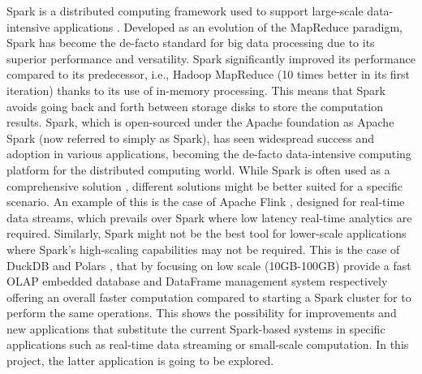 Spark is a distributed computing framework used to support large-scale data-intensive applications \cite{zaharia2010spark}. Developed as an evolution of the MapReduce paradigm, Spark has become the de-facto standard for big data processing due to its superior performance and versatility. Spark significantly improved its performance compared to its predecessor, i.e., Hadoop MapReduce (10 times better in its first iteration) \cite{zaharia2010spark} thanks to its use of in-memory processing. This means that Spark avoids going back and forth between storage disks to store the computation results. Spark, which is open-sourced under the Apache foundation as Apache Spark (now referred to simply as Spark), has seen widespread success and adoption in various applications, becoming the de-facto data-intensive computing platform for the distributed computing world. While Spark is often used as a comprehensive solution \cite{zahariaApacheSparkUnified2016}, different solutions might be better suited for a specific scenario.
An example of this is the case of Apache Flink \cite{carboneApacheFlinkStream}, designed for real-time data streams, which prevails over Spark where low latency real-time analytics are required. Similarly, Spark might not be the best tool for lower-scale applications where Spark's high-scaling capabilities may not be required. This is the case of DuckDB \cite{raasveldtDuckDBEmbeddableAnalytical2019} and Polars \cite{vinkWroteOneFastest2021}, that by focusing on low scale (10GB-100GB) provide a fast \gls{OLAP} embedded database and DataFrame management system respectively offering an overall faster computation compared to starting a Spark cluster for to perform the same operations. This shows the possibility for improvements and new applications that substitute the current Spark-based systems in specific applications such as real-time data streaming or small-scale computation. In this project, the latter application is going to be explored.

